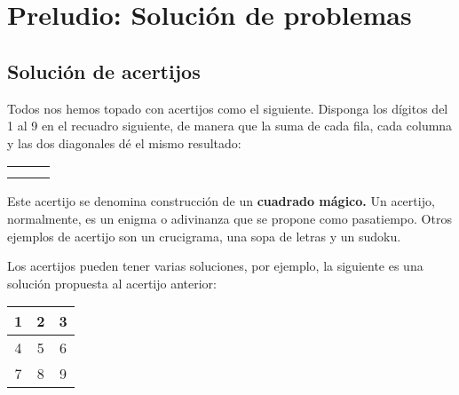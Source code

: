 \chapter{Preludio: Solución de problemas}


\section{Solución de acertijos}


Todos nos hemos topado con acertijos como el siguiente. Disponga los
dígitos del 1 al 9 en el recuadro siguiente, de manera que la suma
de cada fila, cada columna y las dos diagonales dé el mismo resultado:

\begin{center}
\begin{tabular}{|c|c|c|}
\hline 
 &  & \tabularnewline
\hline 
 &  & \tabularnewline
\hline 
 &  & \tabularnewline
\hline 
\end{tabular}
\par\end{center}

Este acertijo se denomina construcción de un \textbf{cuadrado mágico.
}Un acertijo, normalmente, es un enigma o adivinanza que se propone
como pasatiempo. Otros ejemplos de acertijo son un crucigrama, una
sopa de letras y un sudoku.

Los acertijos pueden tener varias soluciones, por ejemplo, la siguiente
es una solución propuesta al acertijo anterior:

\begin{center}
\begin{tabular}{|c|c|c|}
\hline 
1  & 2  & 3\tabularnewline
\hline 
4  & 5  & 6\tabularnewline
\hline 
7  & 8  & 9 \tabularnewline
\hline 
\end{tabular}
\par\end{center}

